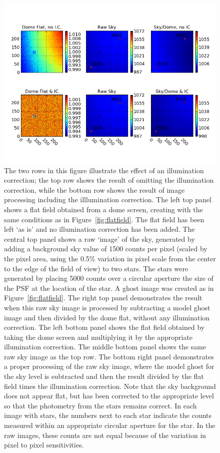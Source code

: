 \documentclass[12pt,preprint]{aastex}
\begin{document}
\begin{figure}[htbp]
\includegraphics[width=6in]{ICeffect}
\caption{ {\small
The two rows in this figure illustrate the effect of an
illumination correction; the top row shows the result of omitting the
illumination correction, while the bottom row shows the result of
image processing including the illlumination correction. 
The left top panel shows a flat field obtained from a dome screen,
creating with the same conditions as in
Figure~\ref{fig:flatfield}. The flat field has been left `as is' and
no illumination correction has been added. The central top panel shows
a raw `image' of the sky, generated by adding a background sky value
of 1500 counts per pixel (scaled by the pixel area, using the 0.5\%
variation in pixel scale from the center to the edge of the field of
view) to two stars. The stars were generated by placing 5000 counts
over a circular aperture the size of the PSF at the location of the
star. A ghost image was created as in Figure~\ref{fig:flatfield}.  The
right top panel demonstrates the result when this raw sky image is
processed by subtracting a model ghost image and then divided by the dome flat, without any illumination
correction. 
The left bottom panel shows the flat field obtained by taking the dome
screen and multiplying it by the appropriate illumination
correction. The middle bottom panel shows the same raw sky image as
the top row. The bottom right panel demonstrates a proper processing
of the raw sky image, where the model ghost for the sky level is
subtracted and then the result divided by the flat field times the
illumination correction. Note that the sky background does not appear
flat, but has been corrected to the appropriate level so that the
photometry from the stars remains correct. 
In each image with stars, the numbers next to each star indicate the
counts measured within an appropriate circular aperture for the
star. In the raw images, these counts are not equal because of the
variation in pixel to pixel sensitivities.  \label{fig:iceffect}
}}
\end{figure}
\end{document}
